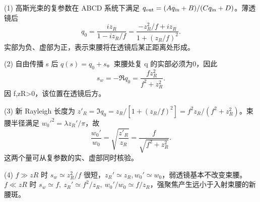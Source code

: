 (1) 高斯光束的复参数在 ABCD 系统下满足 \(q_{\rm out}=(Aq_{\rm in}+B)/(Cq_{\rm in}+D)\)。薄透镜后
\[
q_0=\frac{iz_R}{1-iz_R/f}
=\frac{-z_R^2/f+iz_R}{1+(z_R/f)^2}.
\]
实部为负、虚部为正，表示束腰将在透镜后某正距离处形成。

(2) 自由传播 s 后 \(q(s)=q_0+s\)。束腰处复 q 的实部必须为0，因此
\[
s_w=-\Re q_0=\frac{fz_R^2}{f^2+z_R^2}.
\]
因 f,zR>0，该位置在透镜后方。

(3) 新 Rayleigh 长度为 \(z'_R=\Im q_0=z_R/[1+(z_R/f)^2]=f^2z_R/(f^2+z_R^2)\)。束腰半径满足 \(w_0'^2=\lambda z_R'/\pi\)，故
\[
\frac{w_0'}{w_0}=\sqrt{\frac{z'_R}{z_R}}
=\frac f{\sqrt{f^2+z_R^2}}.
\]
这两个量可从复参数的实、虚部同时核验。

(4) \(f\gg zR\) 时 \(s_w\simeq z_R^2/f\) 很短，\(z_R'\simeq z_R,w_0'\simeq w_0\)，弱透镜基本不改变束腰。\(f\ll zR\) 时 \(s_w\simeq f,\ z_R'\simeq f^2/z_R,\ w_0'/w_0\simeq f/z_R\)，强聚焦产生远小于入射束腰的新腰斑。
